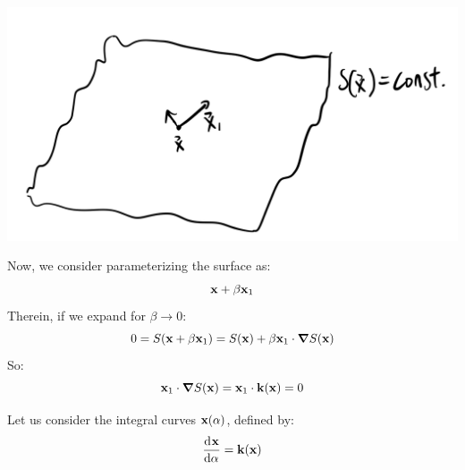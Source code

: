 \begin{center}
    \includegraphics[scale=0.3]{Lectures/Images/lec17-constantphasesurface.png}
\end{center}

Now, we consider parameterizing the surface as:
\begin{equation}
    \mathbf{x} + \beta \mathbf{x}_1
\end{equation}
Therein, if we expand for $\beta \to 0$:
\begin{equation}
   0 = S(\v{x} + \beta\v{x}_1) = S(\v{x}) + \beta \v{x}_1 \cdot \nabla S(\v{x})
\end{equation}
So:
\begin{equation}
    \v{x}_1 \cdot \nabla S(\v{x}) = \v{x}_1 \cdot \v{k}(\v{x}) = 0
\end{equation}

Let us consider the integral curves $\mathbf{x}(\alpha)$, defined by:
\begin{equation}
    \dod{\v{x}}{\alpha} = \v{k}(\v{x})
\end{equation}

